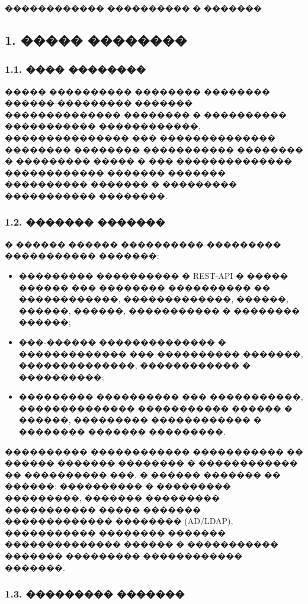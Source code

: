 \documentclass{G7-32}
\begin{document}

\newpage
\begin{center}
{\fontsize{14pt}{21pt}\selectfont\MakeUppercase{������������ ���������� � �������}\par}
\end{center}

\subsection*{1. ����� ��������}

\subsubsection*{1.1. ���� ��������}

����� ���������� �������� �������� ������-��������� ������� �������������� �������� � ���������� ����������� ������������, ��������������� ��� �������������� �������� �������� ����������� �������� � ��������� ����� � ��� �������������� ������������ ������� ������� ���������� ������� � ��������� ����������� ��������.

\subsubsection*{1.2. ������� �������}

� ������ ������ ���������� ��������� ����������� �������:
\begin{itemize}
  \item ��������� ���������� � REST-API � ����� ������ ��� �������� ���������� �� ������������, �������������, ������, ������, ������, ����������� � �������� ������;
  \item ���-������ �������������� � ������������� ��� ���������� �������, ��������������, ������������ � ����������;
  \item ��������� ���������� ��� �����������, �������������� ����������� ������ � ������, ��������� ������������ � �������� ������� ���������.
\end{itemize}

���������� ������������ ����������� �� ������ ������� �������� � ������������ �� ���������� ���.  
� ������ ������� �� ������: ���������� � ��������� ���������, ������� ��������� ����������� ����� ������� ������������� �������� (AD/LDAP), ����������� �������� ������� �������������� ������ � ����������� ������� ��������� ������������ �������.

\subsubsection*{1.3. ��������� �������}
\end{document}
